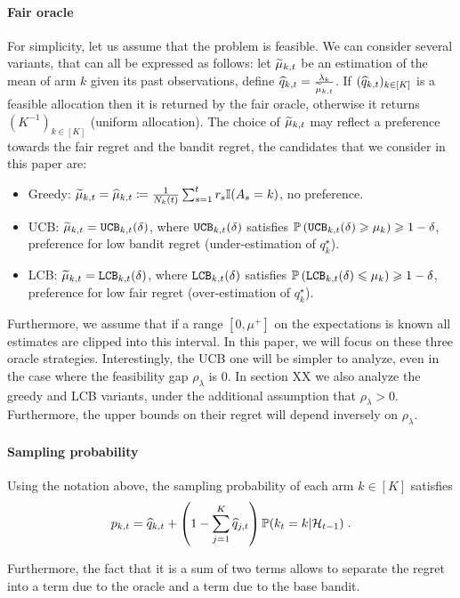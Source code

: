\paragraph{Fair oracle} For simplicity, let us assume that the problem is feasible. We can consider several variants, that can all be expressed as follows: let $\widetilde{\mu}_{k,t}$ be an estimation of the mean of arm $k$ given its past observations, define $\widehat{q}_{k,t}= \frac{\lambda_k}{\widetilde{\mu}_{k, t}}$. If $(\widehat{q}_{k, t})_{k \in [K]}$ is a feasible allocation then it is returned by the fair oracle, otherwise it returns $(K^{-1})_{k \in [K]}$ (uniform allocation). The choice of $\widetilde{\mu}_{k,t}$ may reflect a preference towards the fair regret and the bandit regret, the candidates that we consider in this paper are:
\begin{itemize}
	\item Greedy: $\widetilde{\mu}_{k, t} = \widehat{\mu}_{k, t} \coloneqq \frac{1}{N_k(t)}\sum_{s=1}^t r_s\mathbb{I}(A_s=k)$, no preference.
	\item UCB: $\widetilde{\mu}_{k, t} = \texttt{UCB}_{k, t}(\delta)$, where $\texttt{UCB}_{k, t}(\delta)$ satisfies $\mathbb{P}\left(\texttt{UCB}_{k, t}(\delta) \geqslant \mu_k\right) \geqslant 1-\delta$, preference for low bandit regret (under-estimation of $q_k^\star$).
	\item LCB: $\widetilde{\mu}_{k, t} = \texttt{LCB}_{k, t}(\delta)$, where $\texttt{LCB}_{k, t}(\delta)$ satisfies $\mathbb{P}\left(\texttt{LCB}_{k, t}(\delta) \leqslant \mu_k\right) \geqslant 1-\delta$, preference for low fair regret (over-estimation of $q_k^\star$).
\end{itemize}

Furthermore, we assume that if a range $[0, \mu^+]$ on the expectations is known all estimates are clipped into this interval. In this paper, we will focus on these three oracle strategies. Interestingly, the UCB one will be simpler to analyze, even in the case where the feasibility gap $\rho_\lambda$ is $0$. In section XX we also analyze the greedy and LCB variants, under the additional assumption that $\rho_\lambda>0$. Furthermore, the upper bounds on their regret will depend inversely on $\rho_\lambda$.


\paragraph{Sampling probability} Using the notation above, the sampling probability of each arm $k \in [K]$ satisfies 
\begin{equation}\label{eq::sampling_prob} p_{k,t} = \widehat{q}_{k, t} + \left(1-\sum_{j=1}^K \widehat{q}_{j, t}\right) \mathbb{P}(k_t=k | \mathcal{H}_{t-1}) \;. \end{equation}

Furthermore, the fact that it is a sum of two terms allows to separate the regret into a term due to the oracle and a term due to the base bandit.  